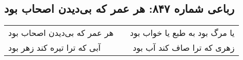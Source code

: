 \begin{center}
\section*{رباعی شماره ۸۴۷: هر عمر که بی‌دیدن اصحاب بود}
\label{sec:0847}
\begin{longtable}{l p{0.5cm} r}
هر عمر که بی‌دیدن اصحاب بود
&&
یا مرگ بود به طبع یا خواب بود
\\
آبی که ترا تیره کند زهر بود
&&
زهری که ترا صاف کند آب بود
\\
\end{longtable}
\end{center}
